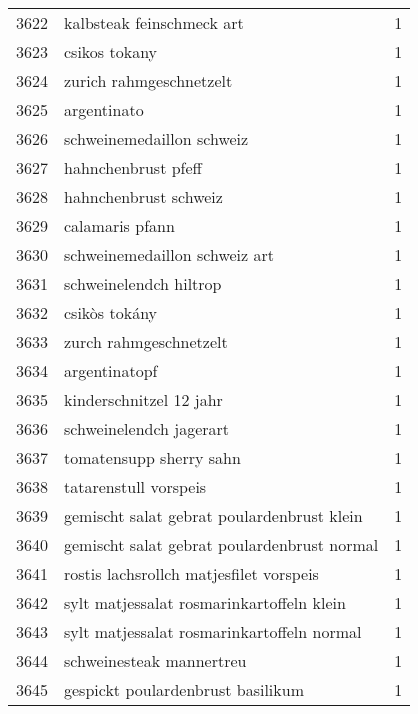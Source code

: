 \begin{tabular}{llr}
3622 &                          kalbsteak feinschmeck art &      1 \\
3623 &                                      csikos tokany &      1 \\
3624 &                            zurich rahmgeschnetzelt &      1 \\
3625 &                                        argentinato &      1 \\
3626 &                          schweinemedaillon schweiz &      1 \\
3627 &                                hahnchenbrust pfeff &      1 \\
3628 &                              hahnchenbrust schweiz &      1 \\
3629 &                                    calamaris pfann &      1 \\
3630 &                      schweinemedaillon schweiz art &      1 \\
3631 &                             schweinelendch hiltrop &      1 \\
3632 &                                      csikòs tokány &      1 \\
3633 &                             zurch rahmgeschnetzelt &      1 \\
3634 &                                      argentinatopf &      1 \\
3635 &                            kinderschnitzel 12 jahr &      1 \\
3636 &                            schweinelendch jagerart &      1 \\
3637 &                            tomatensupp sherry sahn &      1 \\
3638 &                              tatarenstull vorspeis &      1 \\
3639 &         gemischt salat gebrat poulardenbrust klein &      1 \\
3640 &        gemischt salat gebrat poulardenbrust normal &      1 \\
3641 &            rostis lachsrollch matjesfilet vorspeis &      1 \\
3642 &          sylt matjessalat rosmarinkartoffeln klein &      1 \\
3643 &         sylt matjessalat rosmarinkartoffeln normal &      1 \\
3644 &                           schweinesteak mannertreu &      1 \\
3645 &                  gespickt poulardenbrust basilikum &      1 \\

\end{tabular}
